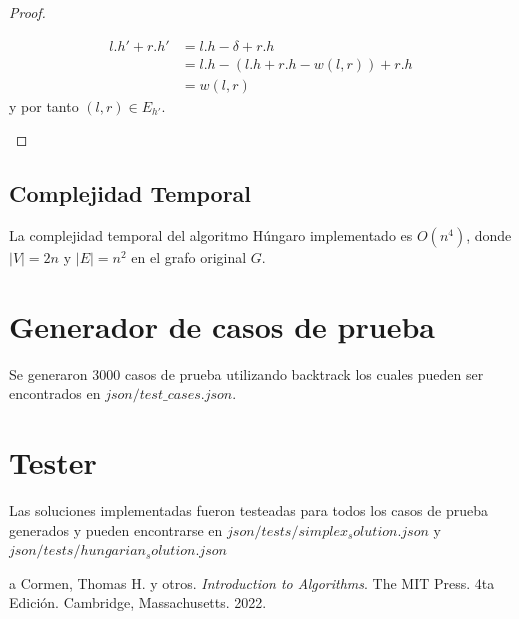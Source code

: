 \documentclass[10pt]{article} %
\begin{document}
\begin{proof}
\begin{enumerate}
			\begin{align*}
				l.h' + r.h' &= l.h - \delta + r.h\\
				&= l.h - (l.h + r.h -w(l,r)) + r.h\\
				&= w(l,r)			
			\end{align*}
			y por tanto $(l,r) \in E_{h'}$. 
			
			
		\end{enumerate}
		
	\end{proof}
	
	
	\subsection{Complejidad Temporal}
	
	La complejidad temporal del algoritmo H\'ungaro implementado es $O(n^4)$, donde $|V|=2n$ y $|E|=n^2$ en el grafo original $G$.
	
	\section{Generador de casos de prueba}
	
	Se generaron 3000 casos de prueba utilizando backtrack los cuales pueden ser encontrados en $ json/test\_cases.json $.
	
	\section{Tester}
	 Las soluciones implementadas fueron testeadas para todos los casos de prueba generados y pueden encontrarse en $ json/tests/simplex_solution.json $ y $ json/tests/hungarian_solution.json $
	
	
	\begin{thebibliography}
		a
		 Cormen, Thomas H. y otros. \emph{Introduction to Algorithms}. 
		The MIT Press.
		4ta Edici\'on.		
		Cambridge, Massachusetts.
		2022.
	\end{thebibliography}
\end{document}
